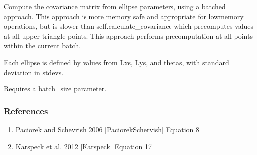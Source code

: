 \documentclass[letterpaper,10pt,english]{sphinxmanual}
\begin{document}
\begin{fulllineitems}
\begin{fulllineitems}
\begin{quote}
\begin{description}
\end{description}\end{quote}

\end{fulllineitems}


\begin{fulllineitems}
\label{\detokenize{ellipse:glomar_gridding.ellipse.EllipseCovarianceBuilder.calculate_covariance_batched}}
\pysigstartsignatures
\pysiglinewithargsret
{}
{}
{}
\pysigstopsignatures
\sphinxAtStartPar
Compute the covariance matrix from ellipse parameters, using a batched
approach.
This approach is more memory safe and appropriate for low\sphinxhyphen{}memory
operations, but is slower than self.calculate\_covariance
which pre\sphinxhyphen{}computes values at all upper triangle points. This approach
performs pre\sphinxhyphen{}computation at all points within the current batch.

\sphinxAtStartPar
Each ellipse is defined by values from Lxs, Lys, and thetas, with
standard deviation in stdevs.

\sphinxAtStartPar
Requires a batch\_size parameter.
\begin{quote}\begin{description}
\sphinxAtStartPar
{}

\end{description}\end{quote}
\subsubsection*{References}
\begin{enumerate}
%
\item {}
\sphinxAtStartPar
Paciorek and Schevrish 2006 {[}PaciorekSchervish{]} Equation 8

\item {}
\sphinxAtStartPar
Karspeck et al. 2012 {[}Karspeck{]} Equation 17

\end{enumerate}

\end{fulllineitems}


\end{fulllineitems}
\end{document}
